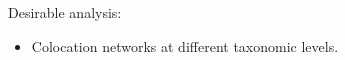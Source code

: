 Desirable analysis:
\begin{itemize}
\item Colocation networks at different taxonomic levels.

\end{itemize}
%
%
%
%
